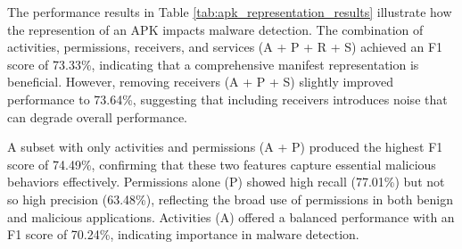 \begin{table}[b!]
    \caption{\label{tab:apk_representation_results}%
    Performance of different APK representations using frozen ModernBERT embeddings. Features are extracted from Android manifest.xml (A=Activities, P=Permissions, R=Receivers, S=Services). Results reported on time-based transcend subset split after five epochs.}
\end{table}

The performance results in Table \ref{tab:apk_representation_results} 
illustrate how the represention of an APK impacts malware detection. 
The combination of activities, permissions, receivers, and services (A + P + R + S) 
achieved an F1 score of 73.33\%, indicating that a comprehensive manifest representation 
is beneficial. However, removing receivers (A + P + S) 
slightly improved performance to 73.64\%, suggesting that including receivers 
introduces noise that can degrade overall performance.

A subset with only activities and permissions (A + P) produced the highest F1 
score of 74.49\%, confirming that these two features capture essential malicious behaviors 
effectively. Permissions alone (P) showed high recall (77.01\%) 
but not so high precision (63.48\%), 
reflecting the broad use of permissions in both benign and malicious applications. 
Activities (A) offered a balanced performance with an F1 score of 70.24\%, 
indicating  importance in malware detection.

